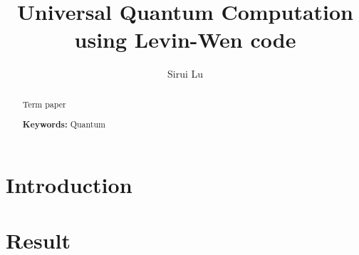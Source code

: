 \documentclass[aps,pra,onecolumn,notitlepage]{revtex4-1}
\begin{document}
\begin{abstract}
Term paper

\textbf{Keywords: } Quantum
\end{abstract}

\title{Universal Quantum Computation using Levin-Wen code}
\author{Sirui Lu}




\maketitle

\tableofcontents

\section{Introduction}\label{introduction}

\citep{bravyi2010topological}

\citep{bravyi2011short}

\citep{bravyi3252analytic}

\citep{koenig2010quantum}

\section{Result}\label{result}


\end{document}
